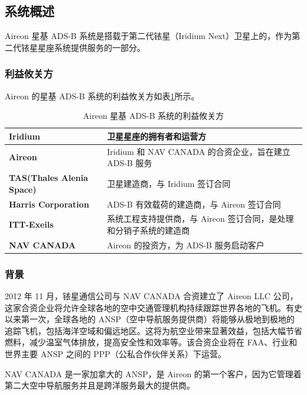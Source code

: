 \subsection{系统概述}

Aireon 星基 ADS-B 系统是搭载于第二代铱星（Iridium Next）卫星上的，作为第二代铱星星座系统提供服务的一部分。

\subsubsection{利益攸关方}

Aireon 的星基 ADS-B 系统的利益攸关方如表\ref{tab:stakeholders_of_Aireon_ads-b}所示。

\renewcommand\arraystretch{1.5}
\begin{table}[!htb]
\centering
\caption{Aireon 星基 ADS-B 系统的利益攸关方}
\label{tab:stakeholders_of_Aireon_ads-b}
\begin{tabular}[b]{|p{6cm}<{\raggedleft}|p{8cm}<{\raggedright}|}
\hline
\textbf{Iridium} & 卫星星座的拥有者和运营方 \\
\hline
\textbf{Aireon} & Iridium 和 NAV CANADA 的合资企业，旨在建立 ADS-B 服务 \\
\hline
\textbf{TAS(Thales Alenia Space)}& 卫星建造商，与 Iridium 签订合同 \\
\hline
\textbf{Harris Corporation} & ADS-B 有效载荷的建造商，与 Aireon 签订合同 \\
\hline
\textbf{ITT-Exeils} & 系统工程支持提供商，与 Aireon 签订合同，是处理和分销子系统的建造商 \\
\hline
\textbf{NAV CANADA} & Aireon 的投资方，为 ADS-B 服务启动客户 \\
\hline
\end{tabular}
\end{table}

\subsubsection{背景}

2012 年 11 月，铱星通信公司与 NAV CANADA 合资建立了 Aireon LLC 公司，这家合资企业将允许全球各地的空中交通管理机构持续跟踪世界各地的飞机。有史以来第一次，全球各地的 ANSP（空中导航服务提供商）将能够从极地到极地的追踪飞机，包括海洋空域和偏远地区。这将为航空业带来显著效益，包括大幅节省燃料，减少温室气体排放，提高安全性和效率等。该合资企业将在 FAA、行业和世界主要 ANSP 之间的 PPP（公私合作伙伴关系）下运营。

NAV CANADA 是一家加拿大的 ANSP，是 Aireon 的第一个客户，因为它管理着第二大空中导航服务并且是跨洋服务最大的提供商。

